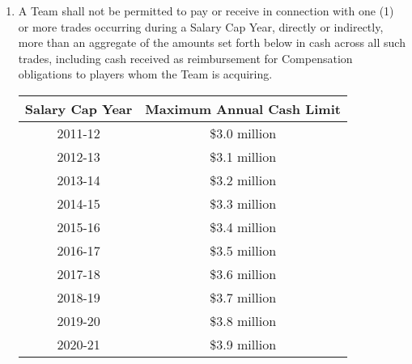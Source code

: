 \documentclass[
]{book}
\begin{document}
\begin{enumerate}
\def\labelenumi{(\alph{enumi})}
\item
  A Team shall not be permitted to pay or receive in connection with one (1) or more trades occurring during a Salary Cap Year, directly or indirectly, more than an aggregate of the amounts set forth below in cash across all such trades, including cash received as reimbursement for Compensation obligations to players whom the Team is acquiring.

  \begin{longtable}[]{@{}cc@{}}
  \toprule()
  Salary Cap Year & Maximum Annual Cash Limit \\
  \midrule()
  \endhead
  2011-12 & \$3.0 million \\
  2012-13 & \$3.1 million \\
  2013-14 & \$3.2 million \\
  2014-15 & \$3.3 million \\
  2015-16 & \$3.4 million \\
  2016-17 & \$3.5 million \\
  2017-18 & \$3.6 million \\
  2018-19 & \$3.7 million \\
  2019-20 & \$3.8 million \\
  2020-21 & \$3.9 million \\
  \bottomrule()
  \end{longtable}


\end{enumerate}
\end{document}
